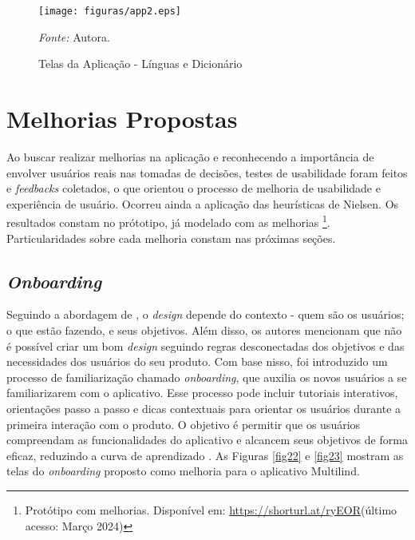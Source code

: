 \begin{figure}[h!]
	\centering
	\caption{Telas da Aplicação - Línguas e Dicionário}
	\begin{adjustbox}{center}
		\texttt{[image: figuras/app2.eps]}
	\end{adjustbox}
	\begin{tablenotes}[flushleft]
		\centering
		\item \textit{Fonte:} Autora.
	\end{tablenotes}
	\label{fig19}
\end{figure}

\section{Melhorias Propostas}
\label{sec:Melhorias Propostas}
Ao buscar realizar melhorias na aplicação e reconhecendo a importância de envolver usuários reais nas tomadas de decisões, testes de usabilidade foram feitos e \textit{feedbacks} coletados, 
o que orientou o processo de melhoria de usabilidade e experiência de usuário. Ocorreu ainda a aplicação das heurísticas de Nielsen. Os resultados constam no prótotipo, já modelado com as melhorias
\footnote{Protótipo com melhorias. Disponível em: \url{https://shorturl.at/ryEOR}(último acesso: Março 2024)}. Particularidades sobre cada melhoria constam nas próximas seções.

\subsection{\textit{Onboarding}}
\label{sec:Onboarding}
Seguindo a abordagem de , o \textit{design} depende do contexto - quem são os usuários; o que estão fazendo, e seus objetivos. Além disso, os autores mencionam que não é possível 
criar um bom \textit{design} seguindo regras desconectadas dos objetivos e das necessidades dos usuários do seu produto. Com base nisso, foi introduzido um processo de familiarização chamado \textit{onboarding}, que 
auxilia os novos usuários a se familiarizarem com o aplicativo. Esse processo pode incluir tutoriais interativos, orientações passo a passo e dicas contextuais para orientar os usuários durante a primeira interação com 
o produto. O objetivo é permitir que os usuários compreendam as funcionalidades do aplicativo e alcancem seus objetivos de forma eficaz, reduzindo a curva de aprendizado \cite{renz2014}. As Figuras \ref{fig22} e \ref{fig23} mostram as 
telas do \textit{onboarding} proposto como melhoria para o aplicativo Multilind.

